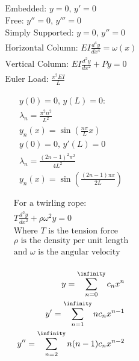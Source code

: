 \documentclass[12pt]{article}
\begin{document}
\begin{multicols}{2}

  \begin{equation}
    \begin{split}
      \text{Embedded: } y=0,\,y'=0\\
      \text{Free: } y''=0,\,y'''=0\\
      \text{Simply Supported: } y=0,\,y''=0\\
      \text{Horizontal Column: } EI\frac{d^4y}{dx^4}=\omega(x)\\
      \text{Vertical Column: } EI\frac{d^2y}{dx^2}+Py=0\\
      \text{Euler Load: } \frac{\pi^2EI}{L}
    \end{split}
    \label{13}
  \end{equation}

  \begin{equation}
    \begin{split}
      y(0)=0,\,y(L)=0:\\
      \lambda_n=\frac{\pi^2n^2}{L^2}\\
      y_n(x)=\sin\left( \frac{n\pi}{L}x \right)\\
      y(0)=0,\,y'(L)=0\\
      \lambda_n=\frac{(2n-1)^2\pi^2}{4L^2}\\
      y_n(x)=\sin\left( \frac{(2n-1)\pi x}{2L} \right)
    \end{split}
    \label{14}
  \end{equation}

\end{multicols}

\begin{multicols}{2}

  \begin{equation}
    \begin{split}
      \text{For a twirling rope:}\\
      T\frac{d^2y}{dx^2}+\rho\omega^2y=0\\
      \text{Where $T$ is the tension force}\\
      \text{$\rho$ is the density per unit length}\\
      \text{and $\omega$ is the angular velocity}\\
    \end{split}
    \label{15}
  \end{equation}

  \begin{equation}
    \begin{split}
      y=\sum_{n=0}^{\infinity} c_nx^n\\
      y'=\sum_{n=1}^{\infinity} nc_nx^{n-1}\\
      y''=\sum_{n=2}^{\infinity} n(n-1)c_nx^{n-2}\\
    \end{split}
    \label{16}
  \end{equation}

\end{multicols}

\vspace{165pt}

\hline
\end{document}
